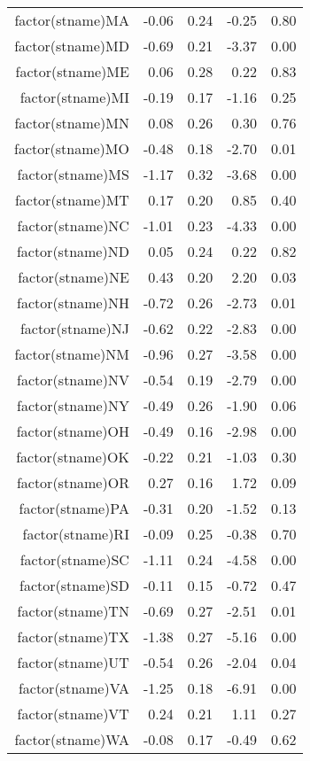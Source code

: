 \begin{table}[ht]
\begin{tabular}{rrrrr}
  factor(stname)MA & -0.06 & 0.24 & -0.25 & 0.80 \\ 
  factor(stname)MD & -0.69 & 0.21 & -3.37 & 0.00 \\ 
  factor(stname)ME & 0.06 & 0.28 & 0.22 & 0.83 \\ 
  factor(stname)MI & -0.19 & 0.17 & -1.16 & 0.25 \\ 
  factor(stname)MN & 0.08 & 0.26 & 0.30 & 0.76 \\ 
  factor(stname)MO & -0.48 & 0.18 & -2.70 & 0.01 \\ 
  factor(stname)MS & -1.17 & 0.32 & -3.68 & 0.00 \\ 
  factor(stname)MT & 0.17 & 0.20 & 0.85 & 0.40 \\ 
  factor(stname)NC & -1.01 & 0.23 & -4.33 & 0.00 \\ 
  factor(stname)ND & 0.05 & 0.24 & 0.22 & 0.82 \\ 
  factor(stname)NE & 0.43 & 0.20 & 2.20 & 0.03 \\ 
  factor(stname)NH & -0.72 & 0.26 & -2.73 & 0.01 \\ 
  factor(stname)NJ & -0.62 & 0.22 & -2.83 & 0.00 \\ 
  factor(stname)NM & -0.96 & 0.27 & -3.58 & 0.00 \\ 
  factor(stname)NV & -0.54 & 0.19 & -2.79 & 0.00 \\ 
  factor(stname)NY & -0.49 & 0.26 & -1.90 & 0.06 \\ 
  factor(stname)OH & -0.49 & 0.16 & -2.98 & 0.00 \\ 
  factor(stname)OK & -0.22 & 0.21 & -1.03 & 0.30 \\ 
  factor(stname)OR & 0.27 & 0.16 & 1.72 & 0.09 \\ 
  factor(stname)PA & -0.31 & 0.20 & -1.52 & 0.13 \\ 
  factor(stname)RI & -0.09 & 0.25 & -0.38 & 0.70 \\ 
  factor(stname)SC & -1.11 & 0.24 & -4.58 & 0.00 \\ 
  factor(stname)SD & -0.11 & 0.15 & -0.72 & 0.47 \\ 
  factor(stname)TN & -0.69 & 0.27 & -2.51 & 0.01 \\ 
  factor(stname)TX & -1.38 & 0.27 & -5.16 & 0.00 \\ 
  factor(stname)UT & -0.54 & 0.26 & -2.04 & 0.04 \\ 
  factor(stname)VA & -1.25 & 0.18 & -6.91 & 0.00 \\ 
  factor(stname)VT & 0.24 & 0.21 & 1.11 & 0.27 \\ 
  factor(stname)WA & -0.08 & 0.17 & -0.49 & 0.62 \\ 

\end{tabular}
\end{table}
